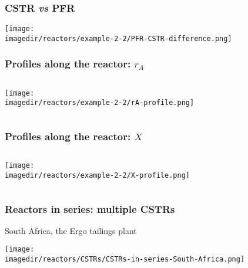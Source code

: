 \begin{frame}\frametitle{CSTR \emph{vs} PFR}
	\begin{center}
		\texttt{[image: \\imagedir/reactors/example-2-2/PFR-CSTR-difference.png]}
	\end{center}
\end{frame}

\begin{frame}\frametitle{Profiles along the reactor: $r_A$}
	\begin{columns}[c]
		\begin{center}
			\texttt{[image: \\imagedir/reactors/example-2-2/rA-profile.png]}
		\end{center}
			{\color{myOrange}{How was this found?}}
	\end{columns}
\end{frame}


\begin{frame}\frametitle{Profiles along the reactor: $X$}
	\begin{columns}[c]
			\begin{center}
				\texttt{[image: \\imagedir/reactors/example-2-2/X-profile.png]}
			\end{center}
			{\color{myOrange}{How was this found?}}
	\end{columns}	
\end{frame}


\begin{frame}\frametitle{Reactors in series: multiple CSTRs}
	South Africa, the Ergo tailings plant
	\begin{center}
		\texttt{[image: \\imagedir/reactors/CSTRs/CSTRs-in-series-South-Africa.png]}
	\end{center}
\end{frame}

